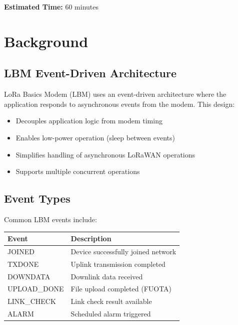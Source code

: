 \documentclass[11pt,a4paper]{article}
\begin{document}
\textbf{Estimated Time:} 60 minutes

\section{Background}

\subsection{LBM Event-Driven Architecture}

LoRa Basics Modem (LBM) uses an event-driven architecture where the application responds to asynchronous events from the modem. This design:

\begin{itemize}
    \item Decouples application logic from modem timing
    \item Enables low-power operation (sleep between events)
    \item Simplifies handling of asynchronous LoRaWAN operations
    \item Supports multiple concurrent operations
\end{itemize}

\subsection{Event Types}

Common LBM events include:

\begin{center}
\begin{tabular}{|l|p{8cm}|}
\hline
\textbf{Event} & \textbf{Description} \\
\hline
JOINED & Device successfully joined network \\
TXDONE & Uplink transmission completed \\
DOWNDATA & Downlink data received \\
UPLOAD\_DONE & File upload completed (FUOTA) \\
LINK\_CHECK & Link check result available \\
ALARM & Scheduled alarm triggered \\
\hline
\end{tabular}
\end{center}

\end{document}

